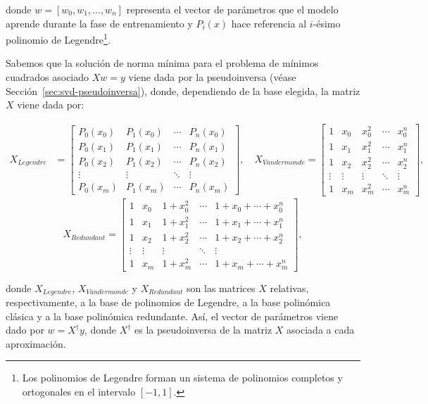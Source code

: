 donde $w = [w_0, w_1, \ldots, w_n]$ representa el vector de parámetros que el modelo aprende durante la fase de entrenamiento y $P_i(x)$ hace referencia al $i$-ésimo polinomio de Legendre\footnote{Los polinomios de Legendre forman un sistema de polinomios completos y ortogonales en el intervalo $[-1, 1]$.}.


Sabemos que la solución de norma mínima para el problema de mínimos cuadrados asociado $Xw=y$ viene dada por la pseudoinversa (véase Sección~\ref{sec:svd-pseudoinversa}), donde, dependiendo de la base elegida, la matriz $X$ viene dada por:

\[
\begin{aligned}
    X_{Legendre} &= 
    \begin{bmatrix}
        P_0(x_0) & P_1(x_0) & \cdots & P_n(x_0) \\
        P_0(x_1) & P_1(x_1) & \cdots & P_n(x_1) \\
        P_0(x_2) & P_1(x_2) & \cdots & P_n(x_2) \\
        \vdots & \vdots & \ddots & \vdots \\
        P_0(x_m) & P_1(x_m) & \cdots & P_n(x_m)
    \end{bmatrix},
    \quad
    X_{Vandermonde} = 
    \begin{bmatrix}
        1 & x_0 & x_0^2 & \cdots & x_0^n \\
        1 & x_1 & x_1^2 & \cdots & x_1^n \\
        1 & x_2 & x_2^2 & \cdots & x_2^n \\
        \vdots & \vdots & \vdots & \ddots & \vdots \\
        1 & x_m & x_m^2 & \cdots & x_m^n
    \end{bmatrix},
\end{aligned}
\]
\vspace{0.5cm}
\[
X_{Redundant} = 
\begin{bmatrix}
    1 & x_0 & 1+x_0^2 & \cdots & 1+x_0+\cdots+x_0^n \\
    1 & x_1 & 1+x_1^2 & \cdots & 1+x_1+\cdots+x_1^n \\
    1 & x_2 & 1+x_2^2 & \cdots & 1+x_2+\cdots+x_2^n \\
    \vdots & \vdots  & \vdots & \ddots & \vdots \\
    1 & x_m & 1+x_m^2 & \cdots & 1+x_m+\cdots+x_m^n
\end{bmatrix},
\]

donde $X_{Legendre}$, $X_{Vandermonde}$ y $X_{Redundant}$ son las matrices $X$ relativas, respectivamente, a la base de polinomios de Legendre, a la base polinómica clásica y a la base polinómica redundante. Así, el vector de parámetros viene dado por $w = X^{\dagger} y$, donde $X^{\dagger}$ es la pseudoinversa de la matriz $X$ asociada a cada aproximación.

